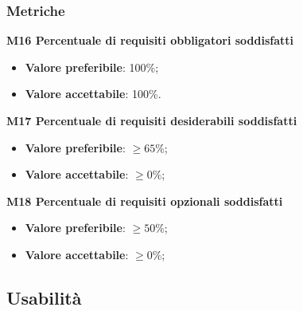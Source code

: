         \subsubsection{Metriche}
            \textbf{M16 Percentuale di requisiti obbligatori soddisfatti}
                \begin{itemize}
                    \item \textbf{Valore preferibile}: 100\%;
                    \item \textbf{Valore accettabile}: 100\%.
                \end{itemize}
            \textbf{M17 Percentuale di requisiti desiderabili soddisfatti}
            \begin{itemize}
            	\item \textbf{Valore preferibile}: $\ge65\%$;
            	\item \textbf{Valore accettabile}: $\ge0\%$;
            \end{itemize}
        	\textbf{M18 Percentuale di requisiti opzionali soddisfatti}
        	\begin{itemize}
        		\item \textbf{Valore preferibile}: $\ge50\%$;
        		\item \textbf{Valore accettabile}: $\ge0\%$;
        	\end{itemize}
    \subsection{Usabilità}
